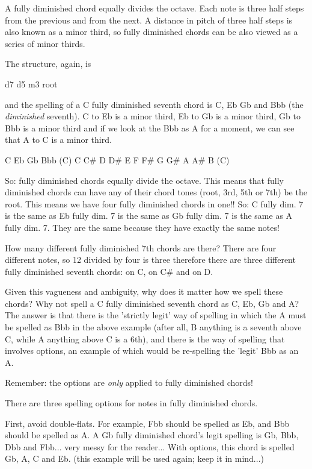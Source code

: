 A fully diminished chord equally divides the octave. Each note is three half
steps from the previous and from the next. A distance in pitch of three half
steps is also known as a minor third, so fully diminished chords can be also
viewed as a series of minor thirds.

The structure, again, is

 d7
 d5
 m3
root

and the spelling of a C fully diminished seventh chord is C, Eb Gb and Bbb
(the \emph{diminished} seventh). C to Eb is a minor third, Eb to Gb is a minor
third, Gb to Bbb is a minor third and if we look at the Bbb as A for a moment,
we can see that A to C is a minor third.

C              Eb             Gb            Bbb             (C)
C    C\#   D    D\#   E    F    F\#   G    G\#   A    A\#   B    (C)

So: fully diminished chords equally divide the octave. This means that fully
diminished chords can have any of their chord tones (root, 3rd, 5th or 7th)
be the root. This means we have four fully diminished chords in one!! So:
C fully dim. 7 is the same as Eb fully dim. 7 is the same as Gb fully dim. 7
is the same as A fully dim. 7. They are the same because they have exactly
the same notes!

How many different fully diminished 7th chords are there? There are four
different notes, so 12 divided by four is three therefore there are three
different fully diminished seventh chords: on C, on C\# and on D.

Given this vagueness and ambiguity, why does it matter how we spell these
chords? Why not spell a C fully diminished seventh chord as C, Eb, Gb and A?
The answer is that there is the 'strictly legit' way of spelling in which the
A must be spelled as Bbb in the above example (after all, B anything is a
seventh above C, while A anything above C is a 6th), and there is the way of
spelling that involves options, an example of which would be re-spelling the
'legit' Bbb as an A.

Remember: the options are \emph{only} applied to fully diminished chords!

There are three spelling options for notes in fully diminished chords.

First, avoid double-flats. For example, Fbb should be spelled as Eb, and
Bbb should be spelled as A. A Gb fully diminished chord's legit spelling
is Gb, Bbb, Dbb and Fbb... very messy for the reader... With options, this
chord is spelled Gb, A, C and Eb. (this example will be used again; keep it
in mind...)

